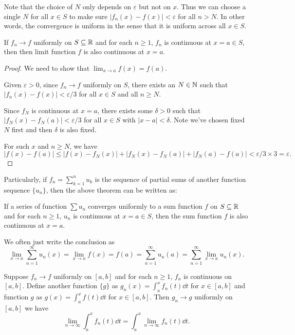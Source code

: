 \documentclass[a4paper]{ctexart}
\begin{document}
    \begin{myrmk}
        Note that the choice of $N$ only depends on $\varepsilon$ but not on $x$. Thus we can choose a single $N$ for all $x\in S$ to make sure $|f_n(x) - f(x)| < \varepsilon$ for all $n > N$. In other words, the convergence is uniform in the sense that it is uniform across all $x\in S$.
    \end{myrmk}
    \begin{mythm}
        If $f_n \to f$ uniformly on $S\subseteq \mathbb{R}$ and for each $n\ge 1$, $f_n$ is continuous at $x=a \in S$, then then limit function $f$ is also continuous at $x=a$.
    \end{mythm}
    \begin{proof}
        We need to show that $\displaystyle \lim_{x\to a} f(x) = f(a)$. 

        Given $\varepsilon >0$, since $f_n \to f$ uniformly on $S$, there exists an $N\in \mathbb{N}$ such that $|f_n(x) - f(x)| < \varepsilon/3$ for all $x\in S$ and all $n \ge N$.

        Since $f_N$ is continuous at $x=a$, there exists some $\delta >0$ such that $|f_N(x) - f_N(a)| < \varepsilon/3$ for all $x\in S$ with $|x-a| < \delta$. Note we've chosen fixed $N$ first and then $\delta$ is also fixed. 

        For such $x$ and $n\ge N$, we have
        \[
        |f(x) - f(a)| \le |f(x) - f_N(x)| + |f_N(x) - f_N(a)| + |f_N(a) - f(a)| < \varepsilon/3 \times 3 = \varepsilon.
        \]
    \end{proof}
    \begin{mypro}
        Particularly, if $f_n=\displaystyle \sum_{k=1}^n u_k$ is the sequence of partial sums of another function sequence $\{u_n\}$, then the above theorem can be written as:

        If a series of function $\displaystyle \sum u_n$ converges uniformly to a sum function $f$ on $S\subseteq \mathbb{R}$ and for each $n\ge 1$, $u_n$ is continuous at $x=a \in S$, then the sum function $f$ is also continuous at $x=a$.

        We often just write the conclusion as
        \[
        \lim_{x\to a} \sum_{n=1}^\infty u_n(x) = \lim_{x\to a} f(x) = f(a)= \sum_{n=1}^\infty u_n(a) = \sum_{n=1}^\infty \lim_{x\to a} u_n(x).
        \]
    \end{mypro}
    \begin{mythm}
        Suppose $f_n \to f$ uniformly on $[a,b]$ and for each $n\ge 1$, $f_n$ is continuous on $[a,b]$. Define another function $\{g\}$ as $g_n(x) = \displaystyle \int _a^x f_n(t) \dd t$ for $x\in [a,b]$ and function $g$ as $g(x) = \displaystyle \int_a^x f(t) \dd t$ for $x\in [a,b]$. Then $g_n \to g$ uniformly on $[a,b]$ we have
        \[
        \lim_{n\to \infty} \int_a^x f_n(t) \dd t = \int_a^x \lim_{n\to \infty} f_n(t) \dd t.
        \]
    \end{mythm}
\end{document}
